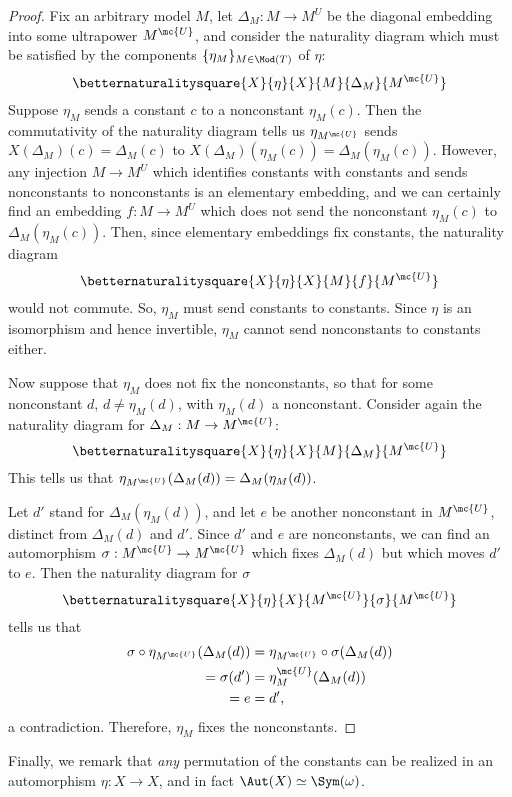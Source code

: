 \begin{proof}
  Fix an arbitrary model $M$, let $\Delta_M : M \to M^{U}$ be the diagonal embedding into some ultrapower $M^{\mc{U}}$, and consider the naturality diagram which must be satisfied by the components $\{\eta_M\}_{M \in \Mod(T)}$ of $\eta$:
  $$
\betternaturalitysquare{X}{\eta}{X}{M}{\Delta_M}{M^{\mc{U}}}
    $$
    Suppose $\eta_M$ sends a constant $c$ to a nonconstant $\eta_M(c)$. Then the commutativity of the naturality diagram tells us $\eta_{M^{\mc{U}}}$ sends $X(\Delta_M)(c) = \Delta_M(c)$ to $X(\Delta_M)(\eta_M(c)) = \Delta_M(\eta_M(c))$. However, any injection $M \to M^U$ which identifies constants with constants and sends nonconstants to nonconstants is an elementary embedding, and we can certainly find an embedding $f : M \to M^{U}$ which does not send the nonconstant $\eta_M(c)$ to $\Delta_M(\eta_M(c))$. Then, since elementary embeddings fix constants, the naturality diagram
  $$
\betternaturalitysquare{X}{\eta}{X}{M}{f}{M^{\mc{U}}}
    $$
    would not commute. So, $\eta_M$ must send constants to constants. Since $\eta$ is an isomorphism and hence invertible, $\eta_M$ cannot send nonconstants to constants either.

    Now suppose that $\eta_M$ does not fix the nonconstants, so that for some nonconstant $d$, $d \neq \eta_M(d)$, with $\eta_M(d)$ a nonconstant.  Consider again the naturality diagram for $\Delta_M : M \to M^{\mc{U}}$:
    $$
\betternaturalitysquare{X}{\eta}{X}{M}{\Delta_M}{M^{\mc{U}}}
    $$
    This tells us that $\eta_{M^{\mc{U}}}(\Delta_M(d)) = \Delta_M(\eta_M(d))$.

    Let $d'$ stand for $\Delta_M(\eta_M(d))$, and let $e$ be another nonconstant in $M^{\mc{U}}$, distinct from $\Delta_M(d)$ and $d'$. Since $d'$ and $e$ are nonconstants, we can find an automorphism $\sigma : M^{\mc{U}} \to M^{\mc{U}}$ which fixes $\Delta_M(d)$ but which moves $d'$ to $e$. Then the naturality diagram for $\sigma$
$$
\betternaturalitysquare{X}{\eta}{X}{M^{\mc{U}}}{\sigma}{M^{\mc{U}}}
$$
tells us that
\begin{align*}
  \sigma \circ \eta_{M^{\mc{U}}}(\Delta_M(d)) &= \eta_{M^{\mc{U}}} \circ \sigma(\Delta_M(d)) \\
  = \sigma(d') &= \eta_M^{\mc{U}}(\Delta_M(d)) \\
                 = e &= d',
\end{align*}
a contradiction. Therefore, $\eta_M$ fixes the nonconstants.
\end{proof}

Finally, we remark that \emph{any} permutation of the constants can be realized in an automorphism $\eta : X \to X$, and in fact $\Aut(X) \simeq \Sym(\omega)$.

